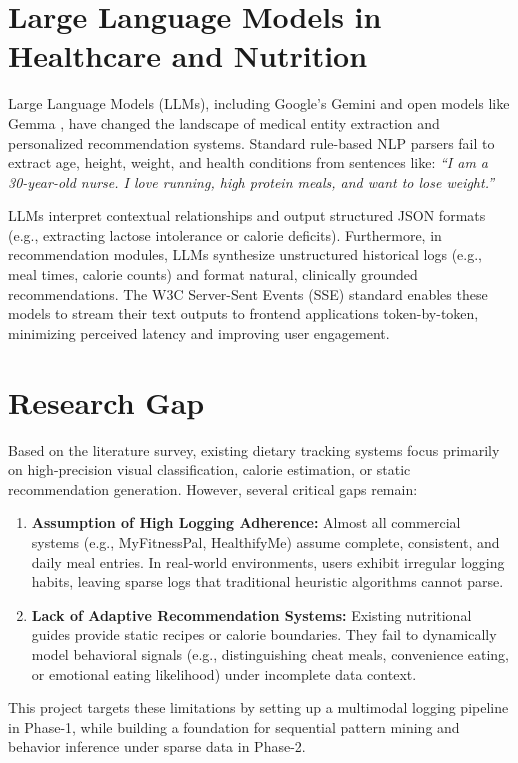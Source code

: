 \documentclass[12pt,a4paper,oneside]{report}
\begin{document}
\section{Large Language Models in Healthcare and Nutrition}
Large Language Models (LLMs), including Google's Gemini \cite{gemini2023gemini} and open models like Gemma \cite{gemma2024gemma}, have changed the landscape of medical entity extraction and personalized recommendation systems. Standard rule-based NLP parsers fail to extract age, height, weight, and health conditions from sentences like: \textit{``I am a 30-year-old nurse. I love running, high protein meals, and want to lose weight.''} 

LLMs interpret contextual relationships and output structured JSON formats (e.g., extracting lactose intolerance or calorie deficits). Furthermore, in recommendation modules, LLMs synthesize unstructured historical logs (e.g., meal times, calorie counts) and format natural, clinically grounded recommendations. The W3C Server-Sent Events (SSE) standard \cite{w3csse} enables these models to stream their text outputs to frontend applications token-by-token, minimizing perceived latency and improving user engagement.

\section{Research Gap}
Based on the literature survey, existing dietary tracking systems focus primarily on high-precision visual classification, calorie estimation, or static recommendation generation. However, several critical gaps remain:
\begin{enumerate}
    \item \textbf{Assumption of High Logging Adherence:} Almost all commercial systems (e.g., MyFitnessPal, HealthifyMe) assume complete, consistent, and daily meal entries. In real-world environments, users exhibit irregular logging habits, leaving sparse logs that traditional heuristic algorithms cannot parse.
    \item \textbf{Lack of Adaptive Recommendation Systems:} Existing nutritional guides provide static recipes or calorie boundaries. They fail to dynamically model behavioral signals (e.g., distinguishing cheat meals, convenience eating, or emotional eating likelihood) under incomplete data context.
\end{enumerate}
This project targets these limitations by setting up a multimodal logging pipeline in Phase-1, while building a foundation for sequential pattern mining and behavior inference under sparse data in Phase-2.
\end{document}
